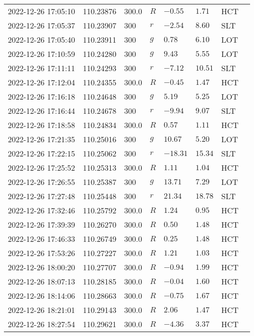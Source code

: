 \documentclass{nature_plusfigure}
\begin{document}
\begin{supplement}
\begin{center}
\begin{longtable}{llllllll}
2022-12-26 17:05:10 & 110.23876 & 300.0 & $R$ & $-0.55$ & $1.71$ & HCT &  \\ 
2022-12-26 17:05:37 & 110.23907 & 300 & $r$ & $-2.54$ & $8.60$ & SLT &  \\ 
2022-12-26 17:05:40 & 110.23911 & 300 & $g$ & $0.78$ & $6.10$ & LOT &  \\ 
2022-12-26 17:10:59 & 110.24280 & 300 & $g$ & $9.43$ & $5.55$ & LOT &  \\ 
2022-12-26 17:11:11 & 110.24293 & 300 & $r$ & $-7.12$ & $10.51$ & SLT &  \\ 
2022-12-26 17:12:04 & 110.24355 & 300.0 & $R$ & $-0.45$ & $1.47$ & HCT &  \\ 
2022-12-26 17:16:18 & 110.24648 & 300 & $g$ & $5.19$ & $5.25$ & LOT &  \\ 
2022-12-26 17:16:44 & 110.24678 & 300 & $r$ & $-9.94$ & $9.07$ & SLT &  \\ 
2022-12-26 17:18:58 & 110.24834 & 300.0 & $R$ & $0.57$ & $1.11$ & HCT &  \\ 
2022-12-26 17:21:35 & 110.25016 & 300 & $g$ & $10.67$ & $5.20$ & LOT &  \\ 
2022-12-26 17:22:15 & 110.25062 & 300 & $r$ & $-18.31$ & $15.34$ & SLT &  \\ 
2022-12-26 17:25:52 & 110.25313 & 300.0 & $R$ & $1.11$ & $1.04$ & HCT &  \\ 
2022-12-26 17:26:55 & 110.25387 & 300 & $g$ & $13.71$ & $7.29$ & LOT &  \\ 
2022-12-26 17:27:48 & 110.25448 & 300 & $r$ & $21.34$ & $18.78$ & SLT &  \\ 
2022-12-26 17:32:46 & 110.25792 & 300.0 & $R$ & $1.24$ & $0.95$ & HCT &  \\ 
2022-12-26 17:39:39 & 110.26270 & 300.0 & $R$ & $0.50$ & $1.48$ & HCT &  \\ 
2022-12-26 17:46:33 & 110.26749 & 300.0 & $R$ & $0.25$ & $1.48$ & HCT &  \\ 
2022-12-26 17:53:26 & 110.27227 & 300.0 & $R$ & $1.21$ & $1.03$ & HCT &  \\ 
2022-12-26 18:00:20 & 110.27707 & 300.0 & $R$ & $-0.94$ & $1.99$ & HCT &  \\ 
2022-12-26 18:07:13 & 110.28185 & 300.0 & $R$ & $-0.04$ & $1.60$ & HCT &  \\ 
2022-12-26 18:14:06 & 110.28663 & 300.0 & $R$ & $-0.75$ & $1.67$ & HCT &  \\ 
2022-12-26 18:21:01 & 110.29143 & 300.0 & $R$ & $2.06$ & $1.47$ & HCT &  \\ 
2022-12-26 18:27:54 & 110.29621 & 300.0 & $R$ & $-4.36$ & $3.37$ & HCT &  \\ 

\end{longtable}
\end{center}
\end{supplement}
\end{document}
